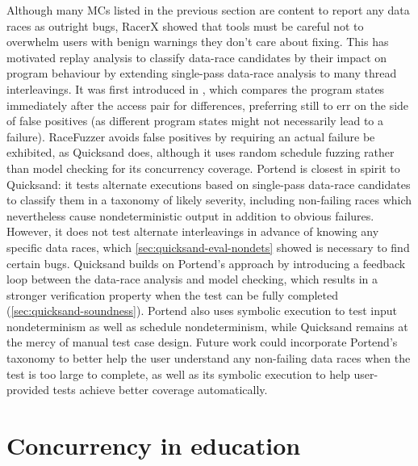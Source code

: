 Although many MCs listed in the previous section are content to report any data races as outright bugs,
RacerX \cite{racerx} showed that tools must be careful not to overwhelm users with benign warnings
they don't care about fixing.
This has motivated replay analysis
to classify data-race candidates by their impact on program behaviour
by extending single-pass data-race analysis to many thread interleavings.
It was first introduced in \cite{recordreplaydrs},
which compares the program states immediately after the access pair for differences,
preferring still to err on the side of false positives (as different program states might not necessarily lead to a failure).
RaceFuzzer \cite{racefuzzer} avoids false positives by requiring an actual failure be exhibited, as Quicksand does,
although it uses random schedule fuzzing rather than model checking for its concurrency coverage.
%
Portend \cite{portend} is closest in spirit to Quicksand:
it tests alternate executions based on single-pass data-race candidates to classify them in a taxonomy of likely severity,
including non-failing races which nevertheless cause nondeterministic output
in addition to obvious failures.
However, it does not
test alternate interleavings in advance of knowing any specific data races,
which \cref{sec:quicksand-eval-nondets} showed is necessary to find certain bugs.
Quicksand builds on Portend's approach by introducing a feedback loop between the data-race analysis and model checking,
which results in a stronger verification property
when the test can be fully completed (\cref{sec:quicksand-soundness}).
Portend also uses symbolic execution to test input nondeterminism as well as schedule nondeterminism,
while Quicksand remains at the mercy of manual test case design.
Future work could incorporate Portend's taxonomy to better help the user understand any non-failing data races
when the test is too large to complete,
as well as its symbolic execution to help user-provided tests achieve better coverage automatically.


\section{Concurrency in education}

